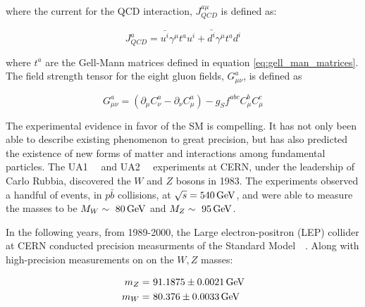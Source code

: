 \noindent where the current for the QCD interaction, $J_{QCD}^{a\mu}$
is defined as:

\begin{equation}\label{eq:sm_qcd_current}
J_{QCD}^{a} = \bar{u^{i}}\gamma^{\mu}t^{a}u^{i} + \bar{d^{i}}\gamma^{\mu}t^{a}d^{i}
\end{equation}

\noindent where $t^{a}$ are the Gell-Mann matrices defined in equation
\ref{eq:gell_man_matrices}.  The field strength tensor for the eight gluon fields,
$G_{\mu\nu}^{a}$, is defined as

\begin{equation}\label{eq:sm_gluon_field_strength_tensor}
G_{\mu\nu}^{a} = (\partial_{\mu}C_{\nu}^{a}
- \partial_{\nu}C_{\mu}^{a}) - g_{S}f^{abc}C_{\mu}^{b}C_{\mu}^{c}  
\end{equation} 

\par The experimental evidence in favor of the SM is compelling.
It has not only been able to describe existing phenomenon to great
precision, but has also predicted the existence of new forms of matter
and interactions among fundamental particles.  The
UA1~\cite{ex:UA1_W}~\cite{ex:UA1_Z} and UA2~\cite{ex:UA2_W}~\cite{ex:UA2_Z}
experiments at CERN, under the leadership of Carlo Rubbia, discovered
the $W$ and $Z$ bosons in 1983.  The experiments observed a handful of
events, in $p\bar{b}$ collisions, at $\sqrt{s}=540\,\text{Ge\hspace{-.08em}V}$, and were able
to measure the masses to be $M_{W}\sim~80\,\text{Ge\hspace{-.08em}V}$ and
$M_{Z}\sim~95\,\text{Ge\hspace{-.08em}V}$.  

\par In the following years, from 1989-2000, the Large
electron-positron (LEP) collider at CERN conducted precision measurments of
the Standard Model~\cite{ex:LEP_Z-Pole}~\cite{ex:LEP-2_W}.  Along with
high-precision measurements on on the $W,Z$ masses:

\begin{equation}\label{eq:lep_WZ_masses}
\begin{aligned}
m_{Z} =&~ 91.1875 \pm 0.0021\,\text{Ge\hspace{-.08em}V} \\
m_{W} =&~ 80.376 \pm 0.0033\,\text{Ge\hspace{-.08em}V} 
\end{aligned}
\end{equation}  

